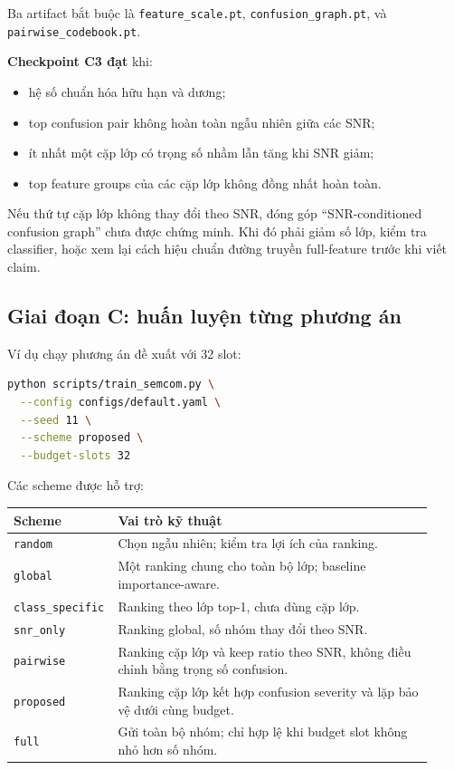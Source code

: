 \documentclass[11pt,journal,onecolumn]{IEEEtran}
\begin{document}
Ba artifact bắt buộc là \texttt{feature\_scale.pt}, \texttt{confusion\_graph.pt}, và \texttt{pairwise\_codebook.pt}.

\textbf{Checkpoint C3 đạt} khi:
\begin{itemize}
\item hệ số chuẩn hóa hữu hạn và dương;
\item top confusion pair không hoàn toàn ngẫu nhiên giữa các SNR;
\item ít nhất một cặp lớp có trọng số nhầm lẫn tăng khi SNR giảm;
\item top feature groups của các cặp lớp không đồng nhất hoàn toàn.
\end{itemize}

Nếu thứ tự cặp lớp không thay đổi theo SNR, đóng góp ``SNR-conditioned confusion graph'' chưa được chứng minh. Khi đó phải giảm số lớp, kiểm tra classifier, hoặc xem lại cách hiệu chuẩn đường truyền full-feature trước khi viết claim.

\subsection{Giai đoạn C: huấn luyện từng phương án}
Ví dụ chạy phương án đề xuất với 32 slot:
\begin{lstlisting}[language=bash]
python scripts/train_semcom.py \
  --config configs/default.yaml \
  --seed 11 \
  --scheme proposed \
  --budget-slots 32
\end{lstlisting}

Các scheme được hỗ trợ:
\begin{longtable}{p{0.18\linewidth}p{0.74\linewidth}}
\toprule
Scheme & Vai trò kỹ thuật \\
\midrule
\endhead
\texttt{random} & Chọn ngẫu nhiên; kiểm tra lợi ích của ranking. \\
\texttt{global} & Một ranking chung cho toàn bộ lớp; baseline importance-aware. \\
\texttt{class\_specific} & Ranking theo lớp top-1, chưa dùng cặp lớp. \\
\texttt{snr\_only} & Ranking global, số nhóm thay đổi theo SNR. \\
\texttt{pairwise} & Ranking cặp lớp và keep ratio theo SNR, không điều chỉnh bằng trọng số confusion. \\
\texttt{proposed} & Ranking cặp lớp kết hợp confusion severity và lặp bảo vệ dưới cùng budget. \\
\texttt{full} & Gửi toàn bộ nhóm; chỉ hợp lệ khi budget slot không nhỏ hơn số nhóm. \\
\bottomrule
\end{longtable}
\end{document}
